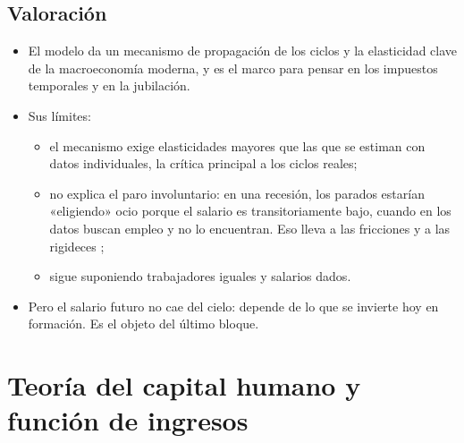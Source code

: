 \documentclass[11pt]{article}
\begin{document}
\subsection{Valoración}\label{sec:lr-valoracion}

\begin{itemize}
\item El modelo da un mecanismo de propagación de los ciclos y la elasticidad clave de la macroeconomía moderna, y es el marco para pensar en los impuestos temporales y en la jubilación.
\item Sus límites:
  \begin{itemize}
  \item el mecanismo exige elasticidades mayores que las que se estiman con datos individuales, la crítica principal a los ciclos reales;
  \item no explica el paro involuntario: en una recesión, los parados estarían «eligiendo» ocio porque el salario es transitoriamente bajo, cuando en los datos buscan empleo y no lo encuentran. Eso lleva a las fricciones y a las rigideces   ;
  \item sigue suponiendo trabajadores iguales y salarios dados.
  \end{itemize}
\item Pero el salario futuro no cae del cielo: depende de lo que se invierte hoy en formación. Es el objeto del último bloque.
\end{itemize}


\section{Teoría del capital humano\cortetitulo{} y función de ingresos}\label{sec:capital-humano}
\end{document}

